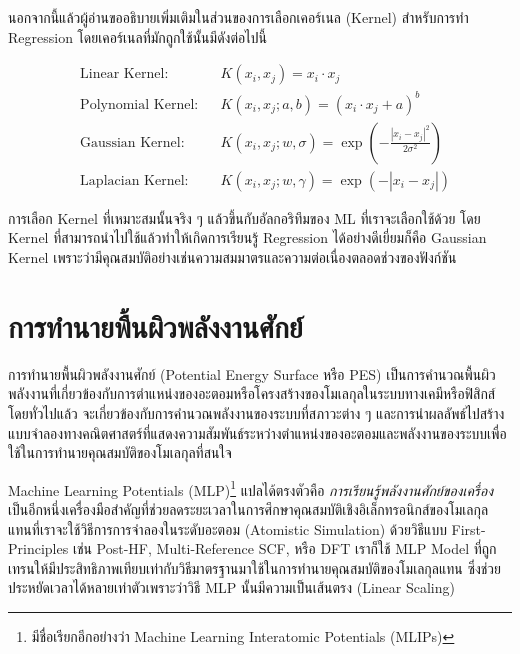 นอกจากนี้แล้วผู้อ่านขออธิบายเพิ่มเติมในส่วนของการเลือกเคอร์เนล (Kernel) สำหรับการทำ Regression โดยเคอร์เนลที่มักถูกใช้นั้นมีดังต่อไปนี้

\begin{framed}
\vspace{-5ex}
\begin{minipage}{0.9\linewidth}
    \begin{align*}
         & \text{Linear Kernel}:     &  & K(x_{i}, x_{j}) = x_{i} \cdot x_{j} \\[0.5ex]
         & \text{Polynomial Kernel}: &  & K(x_{i}, x_{j}; a, b) = (x_{i} \cdot x_{j} + a)^b \\[0.5ex]
         & \text{Gaussian Kernel}:   &  & K(x_{i}, x_{j}; w, \sigma) = \exp \left(-\frac{|x_{i}-x_{j}|^2}{2\sigma^2}
        \right) \\[1.5ex]
         & \text{Laplacian Kernel}:  &  & K(x_{i}, x_{j}; w, \gamma) = \exp \left(-{|x_{i}-x_{j}|}\right)
    \end{align*}
\end{minipage}
\end{framed}

การเลือก Kernel ที่เหมาะสมนั้นจริง ๆ แล้วขึ้นกับอัลกอริทึมของ ML ที่เราจะเลือกใช้ด้วย โดย Kernel ที่สามารถนำไปใช้แล้วทำให้เกิดการเรียนรู้ Regression ได้อย่างดีเยี่ยมก็คือ Gaussian Kernel เพราะว่ามีคุณสมบัติอย่างเช่นความสมมาตรและความต่อเนื่องตลอดช่วงของฟังก์ชัน

\section{การทำนายพื้นผิวพลังงานศักย์}
\label{sec:pred_pot_ener}

การทำนายพื้นผิวพลังงานศักย์ (Potential Energy Surface หรือ PES) เป็นการคำนวณพื้นผิวพลังงานที่เกี่ยวข้องกับการตำแหน่งของอะตอมหรือโครงสร้างของโมเลกุลในระบบทางเคมีหรือฟิสิกส์ โดยทั่วไปแล้ว จะเกี่ยวข้องกับการคำนวณพลังงานของระบบที่สภาวะต่าง ๆ และการนำผลลัพธ์ไปสร้างแบบจำลองทางคณิตศาสตร์ที่แสดงความสัมพันธ์ระหว่างตำแหน่งของอะตอมและพลังงานของระบบเพื่อใช้ในการทำนายคุณสมบัติของโมเลกุลที่สนใจ

Machine Learning Potentials (MLP)\footnote{มีชื่อเรียกอีกอย่างว่า Machine Learning Interatomic Potentials (MLIPs)} แปลได้ตรงตัวคือ \textit{การเรียนรู้พลังงานศักย์ของเครื่อง} เป็นอีกหนึ่งเครื่องมือสำคัญที่ช่วยลดระยะเวลาในการศึกษาคุณสมบัติเชิงอิเล็กทรอนิกส์ของโมเลกุล แทนที่เราจะใช้วิธีการการจำลองในระดับอะตอม (Atomistic Simulation) ด้วยวิธีแบบ First-Principles เช่น Post-HF, Multi-Reference SCF, หรือ DFT เราก็ใช้ MLP Model ที่ถูกเทรนให้มีประสิทธิภาพเทียบเท่ากับวิธีมาตรฐานมาใช้ในการทำนายคุณสมบัติของโมเลกุลแทน ซึ่งช่วยประหยัดเวลาได้หลายเท่าตัวเพราะว่าวิธี MLP นั้นมีความเป็นเส้นตรง (Linear Scaling)


